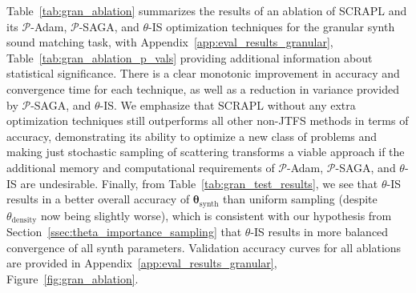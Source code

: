 \documentclass{article} %
\theoremstyle{plain}
\theoremstyle{definition}
\theoremstyle{remark}
\begin{document}
Table~\ref{tab:gran_ablation} summarizes the results of an ablation of SCRAPL and its $\mathcal{P}$-Adam, $\mathcal{P}$-SAGA, and $\theta$-IS optimization techniques for the granular synth sound matching task, with Appendix~\ref{app:eval_results_granular}, Table~\ref{tab:gran_ablation_p_vals} providing additional information about statistical significance.
There is a clear monotonic improvement in accuracy and convergence time for each technique, as well as a reduction in variance provided by $\mathcal{P}$-SAGA, and $\theta$-IS.
We emphasize that SCRAPL without any extra optimization techniques still outperforms all other non-JTFS methods in terms of accuracy, demonstrating its ability to optimize a new class of problems and making just stochastic sampling of scattering transforms a viable approach if the additional memory and computational requirements of $\mathcal{P}$-Adam, $\mathcal{P}$-SAGA, and $\theta$-IS are undesirable.
Finally, from Table~\ref{tab:gran_test_results}, we see that $\theta$-IS results in a better overall accuracy of $\boldsymbol{\theta_{\mathrm{synth}}}$ than uniform sampling (despite $\theta_{\mathrm{density}}$ now being slightly worse), which is consistent with our hypothesis from Section~\ref{ssec:theta_importance_sampling} that $\theta$-IS results in more balanced convergence of all synth parameters.
Validation accuracy curves for all ablations are provided in Appendix~\ref{app:eval_results_granular}, Figure~\ref{fig:gran_ablation}.
\end{document}
